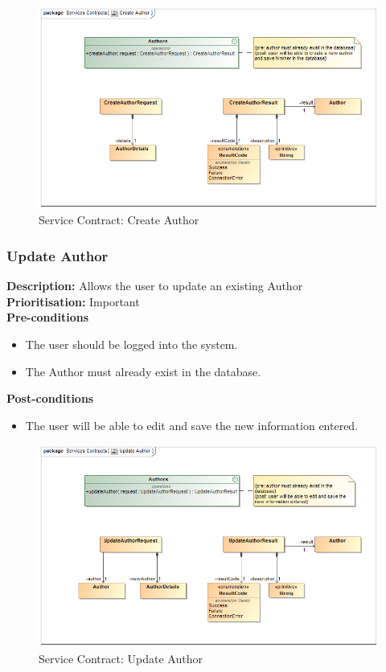 \documentclass[a4paper]{article}
\begin{document}
    	    	\begin{figure}[H]
    	    		\centering
    	    		\includegraphics[width=\textwidth]{../Assignment1/5.1.15.Create.Author.Services.Contract.png}
    	    		\caption{Service Contract: Create Author}
    	    	\end{figure}
    	
    	\pagebreak
    \subsubsection{Update Author}
    	\textbf{Description:} Allows the user to update an existing Author\\
    	\textbf{Prioritisation:} Important\\
    	
    	\textbf{Pre-conditions}
    	 \begin{itemize}
    		\item The user should be logged into the system.
    		\item The Author must already exist in the database.
    	 \end{itemize}
    	
    	\textbf{Post-conditions}
    	 \begin{itemize}
    		\item The user will be able to edit and save the new information entered.
         \end{itemize}
    	    	\begin{figure}[H]
    	    		\centering
    	    		\includegraphics[width=\textwidth]{../Assignment1/5.1.16.Update.Author.Services.Contract.png}
    	    		\caption{Service Contract: Update Author}
    	    	\end{figure}
    	
\end{document}
